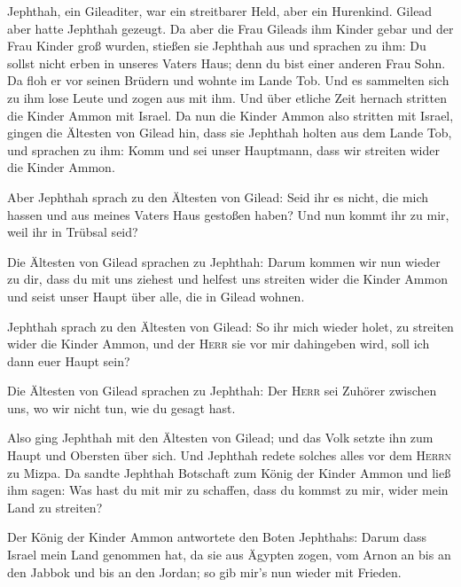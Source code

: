  Jephthah, ein Gileaditer, war ein streitbarer Held, aber
ein Hurenkind. Gilead aber hatte Jephthah gezeugt.  Da
aber die Frau Gileads ihm Kinder gebar und der Frau Kinder groß wurden,
stießen sie Jephthah aus und sprachen zu ihm: Du sollst nicht erben in
unseres Vaters Haus; denn du bist einer anderen Frau Sohn.
 Da floh er vor seinen Brüdern und wohnte im Lande Tob.
Und es sammelten sich zu ihm lose Leute und zogen aus mit ihm.
 Und über etliche Zeit hernach stritten die Kinder Ammon
mit Israel.  Da nun die Kinder Ammon also stritten mit
Israel, gingen die Ältesten von Gilead hin, dass sie Jephthah holten aus
dem Lande Tob,  und sprachen zu ihm: Komm und sei unser
Hauptmann, dass wir streiten wider die Kinder Ammon.

 Aber Jephthah sprach zu den Ältesten von Gilead: Seid ihr
es nicht, die mich hassen und aus meines Vaters Haus gestoßen haben? Und
nun kommt ihr zu mir, weil ihr in Trübsal seid?

 Die Ältesten von Gilead sprachen zu Jephthah: Darum
kommen wir nun wieder zu dir, dass du mit uns ziehest und helfest uns
streiten wider die Kinder Ammon und seist unser Haupt über alle, die in
Gilead wohnen.

 Jephthah sprach zu den Ältesten von Gilead: So ihr mich
wieder holet, zu streiten wider die Kinder Ammon, und der \textsc{Herr}
sie vor mir dahingeben wird, soll ich dann euer Haupt sein?

 Die Ältesten von Gilead sprachen zu Jephthah: Der
\textsc{Herr} sei Zuhörer zwischen uns, wo wir nicht tun, wie du gesagt
hast.

 Also ging Jephthah mit den Ältesten von Gilead; und das
Volk setzte ihn zum Haupt und Obersten über sich. Und Jephthah redete
solches alles vor dem \textsc{Herrn} zu Mizpa.  Da sandte
Jephthah Botschaft zum König der Kinder Ammon und ließ ihm sagen: Was
hast du mit mir zu schaffen, dass du kommst zu mir, wider mein Land zu
streiten?

 Der König der Kinder Ammon antwortete den Boten
Jephthahs: Darum dass Israel mein Land genommen hat, da sie aus Ägypten
zogen, vom Arnon an bis an den Jabbok und bis an den Jordan; so gib
mir's nun wieder mit Frieden.

